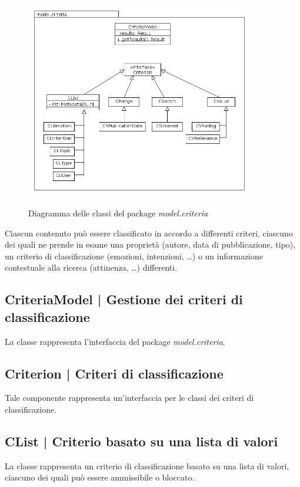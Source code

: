 \documentclass[10pt,a4paper,headinclude,footinclude,hidelinks]{scrreprt} %
\begin{document}
	\begin{figure}[ht]
		\begin{center}
	    	\includegraphics[width=10cm]{class/model_criteria.png}
			\label{gfx:package:model:criteria}
			\caption{Diagramma delle classi del package \textit{model.criteria}}
		\end{center}
	\end{figure}

	Ciascun contenuto può essere classificato in accordo a differenti criteri, ciascuno dei quali ne prende in esame una proprietà (autore, data di pubblicazione, tipo), un criterio di classificazione (emozioni, intenzioni, \ldots) o un informazione contestuale alla ricerca (attinenza, \ldots) differenti.

	\subsection[CriteriaModel]{CriteriaModel | Gestione dei criteri di classificazione}
	\label{sec:stage:design:model.criteria:criteria-model}
	La classe \textit{} rappresenta l'interfaccia del package \textit{model.criteria}.

	\subsection[Criterion]{Criterion | Criteri di classificazione}
	\label{sec:stage:design:model.criteria:criteria}
	Tale componente rappresenta un'interfaccia per le classi dei criteri di classificazione.

	\subsection[CList]{CList | Criterio basato su una lista di valori}
	\label{sec:stage:design:model.criteria:list-criterion}
	La classe \textit{} rappresenta un criterio di classificazione basato su una lista di valori, ciascuno dei quali può essere ammissibile o bloccato. 
\end{document}

